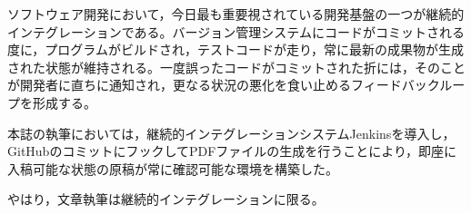 ソフトウェア開発において，今日最も重要視されている開発基盤の一つが継続的インテグレーションである。バージョン管理システムにコードがコミットされる度に，プログラムがビルドされ，テストコードが走り，常に最新の成果物が生成された状態が維持される。一度誤ったコードがコミットされた折には，そのことが開発者に直ちに通知され，更なる状況の悪化を食い止めるフィードバックループを形成する。


本誌の執筆においては，継続的インテグレーションシステムJenkinsを導入し，GitHubのコミットにフックしてPDFファイルの生成を行うことにより，即座に入稿可能な状態の原稿が常に確認可能な環境を構築した。

やはり，文章執筆は継続的インテグレーションに限る。
